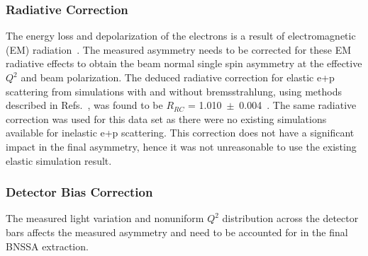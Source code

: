 

\subsubsection{Radiative Correction}
\label{Radiative Correction}
The energy loss and depolarization of the electrons is a result of electromagnetic (EM) radiation~\cite{PhysRev.114.887}. The measured asymmetry needs to be corrected for these EM radiative effects to obtain the beam normal single spin asymmetry at the effective $Q^{2}$ and beam polarization. The deduced radiative correction for elastic e+p scattering from simulations with and without bremsstrahlung, using methods described in Refs.~\cite{PhysRevLett.82.1096, PhysRevC.69.065501}, was found to be $R_{RC}$ = 1.010~$\pm$~0.004~\cite{buddhini_qweak}. The same radiative correction was used for this data set as there were no existing simulations available for inelastic e+p scattering. This correction does not have a significant impact in the final asymmetry, hence it was not unreasonable to use the existing elastic simulation result.


\subsubsection{Detector Bias Correction}
\label{Detector Bias Correction}
The measured light variation and nonuniform $Q^{2}$ distribution across the detector bars affects the measured asymmetry and need to be accounted for in the final BNSSA extraction. 

